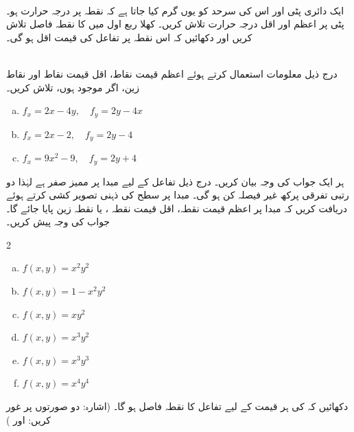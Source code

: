 \\
ایک دائری پٹی   اور اس کی سرحد  کو یوں گرم کیا جاتا ہے کہ نقطہ  پر درجہ حرارت  ہو۔ پٹی پر اعظم اور اقل درجہ حرارت  تلاش کریں۔
کھلا  ربع اول  میں   کا نقطہ  فاصل تلاش کریں اور دکھائیں کہ اس نقطہ پر تفاعل کی قیمت اقل ہو گی۔

\\
درج ذیل معلومات استعمال کرتے ہوئے    اعظم قیمت  نقاط، اقل قیمت  نقاط اور نقاط زین، اگر موجود ہوں، تلاش کریں۔
\begin{enumerate}[a.]
\item
$f_x=2x-4y,\quad f_y=2y-4x$
\item
$f_x=2x-2,\quad f_y=2y-4$
\item
$f_x=9x^2-9,\quad f_y=2y+4$
\end{enumerate}
ہر ایک  جواب کی وجہ بیان کریں۔
درج ذیل تفاعل کے لیے مبدا پر ممیز    صفر ہے لہٰذا دو رتبی تفرقی پرکھ غیر  فیصلہ کن ہو گی۔ مبدا پر سطح  کی ذہنی  تصویر کشی کرتے ہوئے  دریافت کریں کہ مبدا پر اعظم قیمت  نقطہ، اقل قیمت  نقطہ ، یا نقطہ زین پایا جائے گا۔   جواب کی وجہ پیش کریں۔
\begin{multicols}{2}
\begin{enumerate}[a.]
\item
$f(x,y)=x^2y^2$
\item
$f(x,y)=1-x^2y^2$
\item
$f(x,y)=xy^2$
\item
$f(x,y)=x^3y^2$
\item
$f(x,y)=x^3y^3$
\item
$f(x,y)=x^4y^4$
\end{enumerate}
\end{multicols}
دکھائیں کہ   کی ہر قیمت کے لیے   تفاعل  کا نقطہ فاصل ہو گا۔ (اشارہ: دو صورتوں پر غور کریں:  اور )
